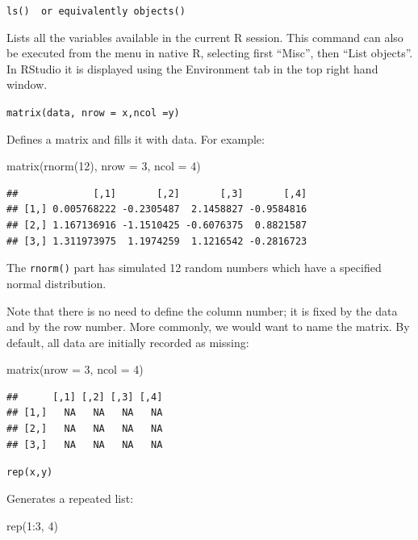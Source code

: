 \documentclass[
]{book}
\newenvironment{Shaded}{\begin{snugshade}}{\end{snugshade}}
\newcommand{\AttributeTok}[1]{\textcolor[rgb]{0.77,0.63,0.00}{#1}}
\newcommand{\DecValTok}[1]{\textcolor[rgb]{0.00,0.00,0.81}{#1}}
\newcommand{\FunctionTok}[1]{\textcolor[rgb]{0.00,0.00,0.00}{#1}}
\newcommand{\NormalTok}[1]{#1}
\newcommand{\SpecialCharTok}[1]{\textcolor[rgb]{0.00,0.00,0.00}{#1}}
\begin{document}
\texttt{ls()\ \ or\ equivalently\ objects()}

Lists all the variables available in the current R session. This command can also be executed from the menu in native R, selecting first ``Misc'', then ``List objects''. In RStudio it is displayed using the Environment tab in the top right hand window.

\texttt{matrix(data,\ nrow\ =\ x,ncol\ =y)}

Defines a matrix and fills it with data. For example:

\begin{Shaded}
\begin{Highlighting}[]
\FunctionTok{matrix}\NormalTok{(}\FunctionTok{rnorm}\NormalTok{(}\DecValTok{12}\NormalTok{), }\AttributeTok{nrow =} \DecValTok{3}\NormalTok{, }\AttributeTok{ncol =} \DecValTok{4}\NormalTok{)}
\end{Highlighting}
\end{Shaded}

\begin{verbatim}
##             [,1]       [,2]       [,3]       [,4]
## [1,] 0.005768222 -0.2305487  2.1458827 -0.9584816
## [2,] 1.167136916 -1.1510425 -0.6076375  0.8821587
## [3,] 1.311973975  1.1974259  1.1216542 -0.2816723
\end{verbatim}

The \texttt{rnorm()} part has simulated 12 random numbers which have a specified normal distribution.

Note that there is no need to define the column number; it is fixed by the data and by the row number. More commonly, we would want to name the matrix. By default, all data are initially recorded as missing:

\begin{Shaded}
\begin{Highlighting}[]
\FunctionTok{matrix}\NormalTok{(}\AttributeTok{nrow =} \DecValTok{3}\NormalTok{, }\AttributeTok{ncol =} \DecValTok{4}\NormalTok{)}
\end{Highlighting}
\end{Shaded}

\begin{verbatim}
##      [,1] [,2] [,3] [,4]
## [1,]   NA   NA   NA   NA
## [2,]   NA   NA   NA   NA
## [3,]   NA   NA   NA   NA
\end{verbatim}

\texttt{rep(x,y)}

Generates a repeated list:

\begin{Shaded}
\begin{Highlighting}[]
\FunctionTok{rep}\NormalTok{(}\DecValTok{1}\SpecialCharTok{:}\DecValTok{3}\NormalTok{, }\DecValTok{4}\NormalTok{)}
\end{Highlighting}
\end{Shaded}
\end{document}
